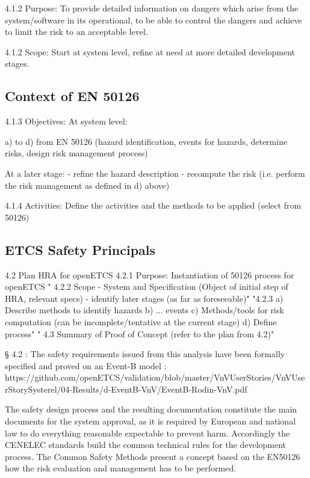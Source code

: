 \documentclass{template/openetcs_report}
\begin{document}
4.1.2 Purpose:
To provide detailed information on dangers which arise from the system/software in its operational, to be able to control the dangers and achieve to limit the risk to an acceptable level.

4.1.2 Scope:
Start at system level, refine at need at more detailed development stages.

\subsection{Context of EN 50126}

4.1.3 Objectives:
At system level:

a) to d) from EN 50126 (hazard identification, events for hazards, determine risks, design risk management process)  

At a later stage:
- refine the hazard description
- recompute the risk
(i.e. perform the risk management as defined in d) above)

4.1.4 Activities:
Define the activities and the methods to be applied (select from 50126)


\subsection{ETCS Safety Principals}

4.2 Plan HRA for openETCS
4.2.1 Purpose: Instantiation of 50126 process for openETCS
"
4.2.2 Scope
- System and Specification 
   (Object of initial step of HRA, relevant specs)
- identify later stages (as far as foreseeable)"
"4.2.3 
a) Describe methods to identify hazards
b) ... events
c) Methods/tools for risk computation (can be incomplete/tentative at the current stage)
d) Define process"
"
4.3 Summary of Proof of Concept
(refer to the plan from 4.2)"

§ 4.2 : The safety requirements issued from this analysis have been formally specified and proved on an Event-B model : https://github.com/openETCS/validation/blob/master/VnVUserStories/VnVUserStorySysterel/04-Results/d-EventB-VnV/EventB-Rodin-VnV.pdf




The safety design process and the resulting documentation constitute the main documents for the system approval, as it is required by European and national law to do everything reasonable expectable to prevent harm. Accordingly the CENELEC standards build the common technical rules for the development process. The Common Safety Methods present a concept based on the EN50126 how the risk evaluation and management has to be performed. 
\end{document}
